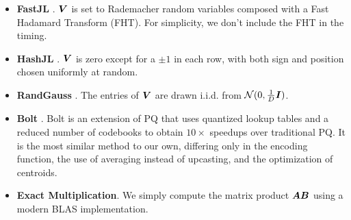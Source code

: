 \begin{itemize}
    \item \textbf{FastJL} \cite{fastjl}. $\bm{V}$ is set to Rademacher random variables composed with a Fast Hadamard Transform (FHT). For simplicity, we don't include the FHT in the timing.
    \item \textbf{HashJL} \cite{hashjl}. $\bm{V}$ is zero except for a $\pm 1$ in each row, with both sign and position chosen uniformly at random.
    \item \textbf{RandGauss} \cite{lshOrig,E2LSH}. The entries of $\bm{V}$ are drawn i.i.d. from $\mathcal{N}(0, \frac{1}{D}\bm{I})$.
    \item \textbf{Bolt} \cite{bolt}. Bolt is an extension of PQ that uses quantized lookup tables and a reduced number of codebooks to obtain $10\times$ speedups over traditional PQ. It is the most similar method to our own, differing only in the encoding function, the use of averaging instead of upcasting, and the optimization of centroids. %
    \item \textbf{Exact Multiplication}. We simply compute the matrix product $\bm{A}\bm{B}$ using a modern BLAS implementation.
\end{itemize}
\vspace{-2.5mm}
